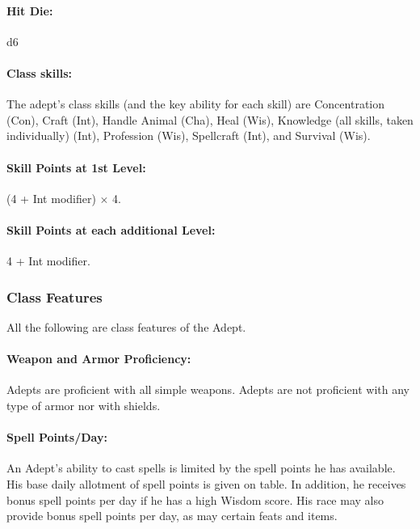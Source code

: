 \paragraph{Hit Die:} d6
\paragraph{Class skills:}
The adept's class skills (and the key ability for each skill) are Concentration (Con), Craft (Int), Handle Animal (Cha), Heal (Wis), Knowledge (all skills, taken individually) (Int), Profession (Wis), Spellcraft (Int), and Survival (Wis).

\paragraph{Skill Points at 1st Level:} (4 + Int modifier) $\times$ 4.
\paragraph{Skill Points at each additional Level:} 4 + Int modifier.

\subsubsection{Class Features}
All the following are class features of the Adept.

\paragraph{Weapon and Armor Proficiency:} 
Adepts are proficient with all simple weapons. Adepts are not proficient with any type of armor nor with shields.

\paragraph{Spell Points/Day:} An Adept's ability to cast spells is limited by the spell points he has available. 
His base daily allotment of spell points is given on  table. 
In addition, he receives bonus spell points per day if he has a high Wisdom score.
His race may also provide bonus spell points per day, as may certain feats and items.

